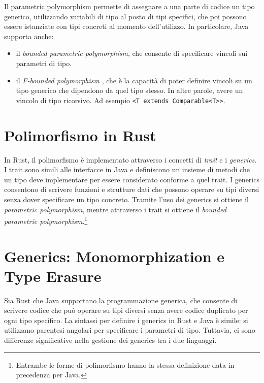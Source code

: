 Il parametric polymorphism permette di assegnare a una parte di codice un tipo generico, utilizzando variabili di tipo al posto di tipi specifici, che poi possono essere istanziate con tipi concreti al momento dell'utilizzo. In particolare, Java supporta anche:
\begin{itemize}
    \item il \textit{bounded parametric polymorphism}, che consente di specificare vincoli sui parametri di tipo.
    \item il \textit{F-bounded polymorphism} \cite{greenman-effing-bound-polymorphism}, che è la capacità di poter definire vincoli su un tipo generico che dipendono da quel tipo stesso. In altre parole, avere un vincolo di tipo ricorsivo. Ad esempio \texttt{<T extends Comparable<T>}\texttt{>}.
\end{itemize}
\section{Polimorfismo in Rust}
In Rust, il polimorfismo è implementato attraverso i concetti di \textit{trait} e i \textit{generics}. I trait sono simili alle interfacce in Java e definiscono un insieme di metodi che un tipo deve implementare per essere considerato conforme a quel trait. I generics consentono di scrivere funzioni e strutture dati che possono operare su tipi diversi senza dover specificare un tipo concreto. Tramite l'uso dei generics si ottiene il \textit{parametric polymorphism}, mentre attraverso i trait si ottiene il \textit{bounded parametric polymorphism}.\footnote{Entrambe le forme di polimorfismo hanno la stessa definizione data in precedenza per Java.}
\section{Generics: Monomorphization e Type Erasure}
\label{sec:generics}
Sia Rust che Java supportano la programmazione generica, che consente di scrivere codice che può operare su tipi diversi senza avere codice duplicato per ogni tipo specifico. La sintassi per definire i generics in Rust e Java è simile: si utilizzano parentesi angolari per specificare i parametri di tipo. Tuttavia, ci sono differenze significative nella gestione dei generics tra i due linguaggi.


